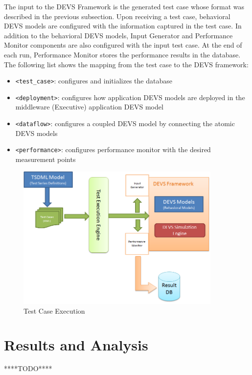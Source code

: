 The input to the DEVS Framework is the generated test case whose format was described in the previous subsection. Upon receiving a test case, behavioral DEVS models are configured with the information captured in the test case. In addition to the behavioral DEVS models, Input Generator and Performance Monitor components are also configured with the input test case. At the end of each run, Performance Monitor stores the performance results in the database. The following list shows the mapping from the test case to the DEVS framework:

\begin{itemize}
	\item \verb|<test_case>|: configures and initializes the database
	\item \verb|<deployment>|: configures how application DEVS models are deployed in the middleware (Executive) application DEVS model
	\item \verb|<dataflow>|: configures a coupled DEVS model by connecting the atomic DEVS models 
	\item \verb|<performance>|: configures performance monitor with the desired measurement points
\end{itemize}

\begin{figure}
	\centering
		\includegraphics[width=0.90\textwidth]{figures/TSDExecution.png}
	\caption{Test Case Execution}
	\label{fig:TSDExecution}
\end{figure}


\section{Results and Analysis}
****TODO****

